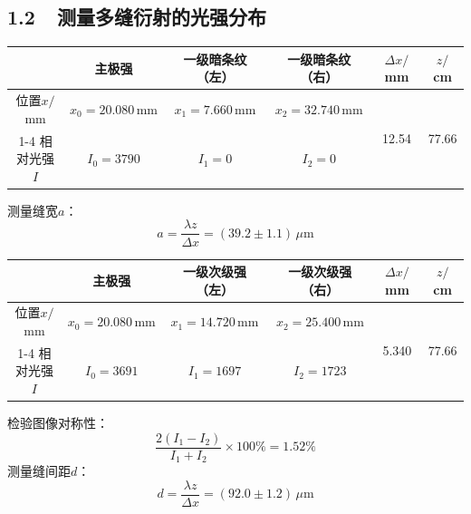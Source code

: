 \documentclass[a4paper,fontset=windows]{ctexbook}
\begin{document}
    \newpage
    \subsection*{ 1.2\ \ 测量多缝衍射的光强分布}

    \begin{table}[ht!]
    \begin{center}
        \begin{tabular}{|c|c|c|c||c|c|}
            \hline
            & 主极强 & 一级暗条纹（左） & 一级暗条纹（右） & $\Delta x/$mm & $z/$cm\\
            \hline
            位置$x/$mm & $x_0 = 20.080\,\mathrm{mm}$ & $x_1 = 7.660\,\mathrm{mm}$ & $x_2 = 32.740\,\mathrm{mm}$ & \multirow{2}{*}{12.54} & \multirow{2}{*}{77.66} \\
            \cline{1-4}
            相对光强$I$ & $I_0 = 3790$ & $I_1 = 0$ & $I_2 = 0$ & &  \\
            \hline
        \end{tabular}
    \end{center}
    \end{table}
    \vspace{-0.5em}

    测量缝宽$a$：
    \[
    a = \frac{\lambda z}{\Delta x} = (39.2\pm1.1)\,\mu\mathrm{m}
    \]

    \begin{table}[ht!]
        \begin{center}
            \begin{tabular}{|c|c|c|c||c|c|}
                \hline
                & 主极强 & 一级次级强（左） & 一级次级强（右） & $\Delta x/$mm & $z/$cm\\
                \hline
                位置$x/$mm & $x_0 = 20.080\,\mathrm{mm}$ & $x_1 = 14.720\,\mathrm{mm}$ & $x_2 = 25.400\,\mathrm{mm}$ & \multirow{2}{*}{5.340} & \multirow{2}{*}{77.66} \\
                \cline{1-4}
                相对光强$I$ & $I_0 = 3691$ & $I_1 = 1697$ & $I_2 = 1723$ & &  \\
                \hline
            \end{tabular}
        \end{center}
    \end{table}
    \vspace{-0.5em}
    检验图像对称性：
    \[
    \frac{2(I_1 - I_2)}{I_1 + I_2}\times100\% = 1.52\%
    \]
    测量缝间距$d$：
    \[
    d = \frac{\lambda z}{\Delta x} = (92.0\pm1.2)\,\mu\mathrm{m}
    \]
\end{document}
